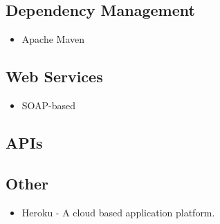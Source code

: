 \subsection{Dependency Management}
\begin{itemize}
	\item Apache Maven
\end{itemize}

\subsection{Web Services}
\begin{itemize}
	\item SOAP-based
\end{itemize} 

\subsection{APIs}
\subsection{Other}
\begin{itemize}
	\item Heroku - A cloud based application platform.
\end{itemize}






